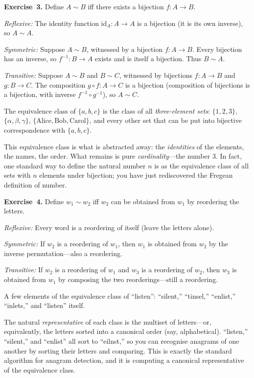 \documentclass[11pt]{article}
\begin{document}
\medskip
\textbf{Exercise~3.}
Define $A \sim B$ iff there exists a bijection $f : A \to B$.

\emph{Reflexive:} The identity function $\mathrm{id}_A : A \to A$ is
a bijection (it is its own inverse), so $A \sim A$.  \checkmark

\emph{Symmetric:} Suppose $A \sim B$, witnessed by a bijection
$f : A \to B$.  Every bijection has an inverse, so $f^{-1} : B \to A$
exists and is itself a bijection.  Thus $B \sim A$.  \checkmark

\emph{Transitive:} Suppose $A \sim B$ and $B \sim C$, witnessed by
bijections $f : A \to B$ and $g : B \to C$.  The composition
$g \circ f : A \to C$ is a bijection (composition of bijections is a
bijection, with inverse $f^{-1} \circ g^{-1}$), so $A \sim C$.
\checkmark

The equivalence class of $\{a, b, c\}$ is the class of all
\emph{three-element sets}: $\{1, 2, 3\}$, $\{\alpha, \beta, \gamma\}$,
$\{\text{Alice}, \text{Bob}, \text{Carol}\}$, and every other set that
can be put into bijective correspondence with $\{a, b, c\}$.

This equivalence class is what is abstracted away: the \emph{identities}
of the elements, the names, the order.  What remains is pure
\emph{cardinality}---the number $3$.  In fact, one standard way to
define the natural number $n$ is as the equivalence class of all sets
with $n$ elements under bijection; you have just rediscovered the
Fregean definition of number.

\medskip
\textbf{Exercise~4.}
Define $w_1 \sim w_2$ iff $w_2$ can be obtained from $w_1$ by
reordering the letters.

\emph{Reflexive:} Every word is a reordering of itself (leave the
letters alone).  \checkmark

\emph{Symmetric:} If $w_2$ is a reordering of $w_1$, then $w_1$ is
obtained from $w_2$ by the inverse permutation---also a reordering.
\checkmark

\emph{Transitive:} If $w_2$ is a reordering of $w_1$ and $w_3$ is a
reordering of $w_2$, then $w_3$ is obtained from $w_1$ by composing
the two reorderings---still a reordering.  \checkmark

A few elements of the equivalence class of ``listen'': ``silent,''
``tinsel,'' ``enlist,'' ``inlets,'' and ``listen'' itself.

The natural \emph{representative} of each class is the multiset of
letters---or, equivalently, the letters sorted into a canonical
order (say, alphabetical).  ``listen,'' ``silent,'' and ``enlist'' all
sort to ``eilnst,'' so you can recognise anagrams of one another by
sorting their letters and comparing.  This is exactly the standard
algorithm for anagram detection, and it is computing a canonical
representative of the equivalence class.
\end{document}
